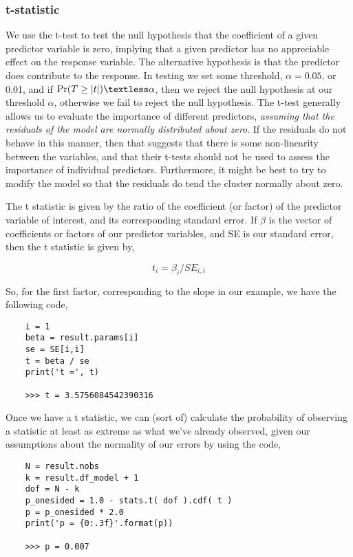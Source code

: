 \subsubsection{t-statistic}

We use the t-test to test the null hypothesis that the coefficient of a given predictor variable is zero, implying that a given predictor has no appreciable effect on the response variable. The alternative hypothesis is that the predictor does contribute to the response. In testing we set some threshold, $\alpha = 0.05$, or  0.01, and if $\Pr(T \ge \vert t \vert) \textless \alpha$, then we reject the null hypothesis at our threshold $\alpha$, otherwise we fail to reject the null hypothesis. The t-test generally allows us to evaluate the importance of different predictors, \emph{assuming that the residuals of the model are normally distributed about zero}. If the residuals do not behave in this manner, then that suggests that there is some non-linearity between the variables, and that their t-tests should not be used to assess the importance of individual predictors. Furthermore, it might be best to try to modify the model so that the residuals do tend the cluster normally about zero.

The t statistic is given by the ratio of the coefficient (or factor) of the predictor variable of interest, and its corresponding standard error. If $\beta$ is the vector of coefficients or factors of our predictor variables, and SE is our standard error, then the t statistic is given by,

\begin{equation}
    t_{i} = \beta_{i} / SE_{i,i}
\end{equation}

So, for the first factor, corresponding to the slope in our example, we have the following code,

\begin{lstlisting}
    i = 1
    beta = result.params[i]
    se = SE[i,i]
    t = beta / se
    print('t =', t)

    >>> t = 3.5756084542390316
\end{lstlisting}

Once we have a t statistic, we can (sort of) calculate the probability of observing a statistic at least as extreme as what we’ve already observed, given our assumptions about the normality of our errors by using the code,

\begin{lstlisting}
    N = result.nobs
    k = result.df_model + 1
    dof = N - k
    p_onesided = 1.0 - stats.t( dof ).cdf( t )
    p = p_onesided * 2.0
    print('p = {0:.3f}'.format(p))

    >>> p = 0.007
\end{lstlisting}

